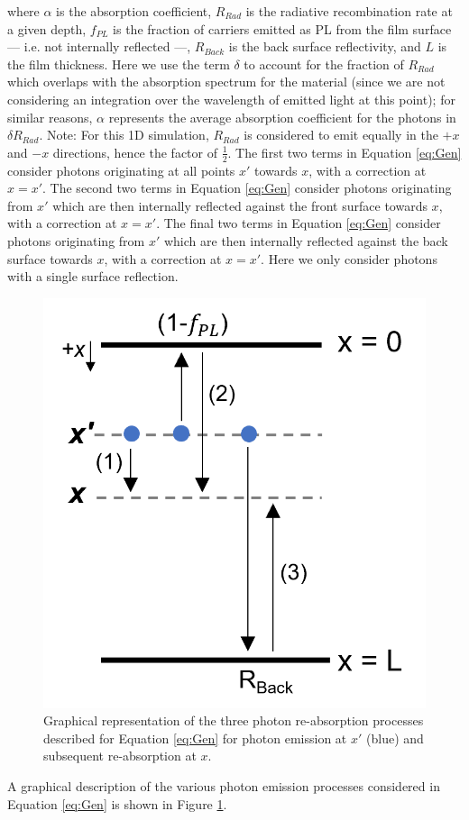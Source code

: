 \documentclass[11pt]{article}
\begin{document}
\par where $ \alpha $ is the absorption coefficient, $ R_{Rad} $ is the radiative recombination rate at a given depth, $ f_{PL} $ is the fraction of carriers emitted as PL from the film surface --- i.e. not internally reflected ---, $ R_{Back} $ is the back surface reflectivity, and $ L $ is the film thickness. Here we use the term $ \delta $ to account for the fraction of $ R_{Rad} $ which overlaps with the absorption spectrum for the material (since we are not considering an integration over the wavelength of emitted light at this point); for similar reasons, $ \alpha $ represents the average absorption coefficient for the photons in $ \delta R_{Rad} $. Note: For this 1D simulation, $ R_{Rad} $ is considered to emit equally in the $ +x $ and $ -x $ directions, hence the factor of $ \frac{1}{2} $. The first two terms in Equation \ref{eq:Gen} consider photons originating at all points $ x' $ towards $ x $, with a correction at $ x = x' $. The second two terms in Equation \ref{eq:Gen} consider photons originating from $ x' $ which are then internally reflected against the front surface towards $ x $, with a correction at $ x = x' $. The final two terms in Equation \ref{eq:Gen} consider photons originating from $ x' $ which are then internally reflected against the back surface towards $ x $, with a correction at $ x = x' $. Here we only consider photons with a single surface reflection.

\begin{figure}[h]
	\label{fig:Gen}
	\centering
	\includegraphics[width=0.3\linewidth]{"Images/Gen"}
	\caption{Graphical representation of the three photon re-absorption processes described for Equation \ref{eq:Gen} for photon emission at $ x' $ (blue) and subsequent re-absorption at $ x $.}
	\label{fig:Gen}
\end{figure}

\par A graphical description of the various photon emission processes considered in Equation \ref{eq:Gen} is shown in Figure \ref{fig:Gen}. 
\end{document}
